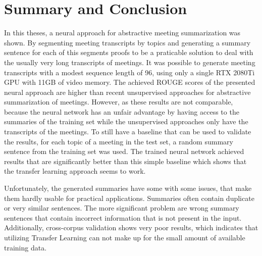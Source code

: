 \chapter{Summary and Conclusion}\label{ch:summary-and-conclusion}

In this theses, a neural approach for abstractive meeting summarization was shown.
By segmenting meeting transcripts by topics and generating a summary sentence for each of this segments proofs to be a praticable solution to deal with the usually very long transcripts of meetings.
It was possible to generate meeting transcripts with a modest sequence length of 96, using only a single RTX 2080Ti GPU with 11GB of video memory.
The achieved ROUGE scores of the presented neural approach are higher than recent unsupervised approaches for abstractive summarization of meetings.
However, as these results are not comparable, because the neural network has an unfair advantage by having access to the summaries of the training set while the unsupervised approaches only have the transcripts of the meetings.
To still have a baseline that can be used to validate the results, for each topic of a meeting in the test set, a random summary sentence from the training set was used.
The trained neural network achieved results that are significantly better than this simple baseline which shows that the transfer learning approach seems to work.

Unfortunately, the generated summaries have some with some issues, that make them hardly usable for practical applications.
Summaries often contain duplicate or very similar sentences.
The more significant problem are wrong summary sentences that contain incorrect information that is not present in the input.
Additionally, cross-corpus validation shows very poor results, which indicates that utilizing Transfer Learning can not make up for the small amount of available training data.